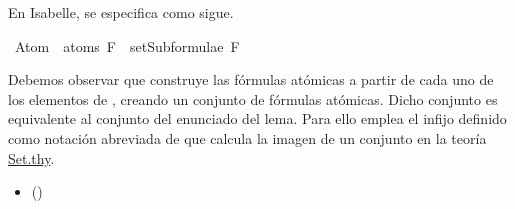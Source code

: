 \begin{isabellebody}
\begin{isamarkuptext}
  En Isabelle, se especifica como sigue.%
\end{isamarkuptext}\isamarkuptrue%
\isamarkupfalse%
\ {\isachardoublequoteopen}Atom\ {\isacharbackquote}\ atoms\ F\ {\isasymsubseteq}\ setSubformulae\ F{\isachardoublequoteclose}\isanewline
%
\isadelimproof
\ \ %
\endisadelimproof
%
\isatagproof
{}\isamarkupfalse%
%
\endisatagproof
{\isafoldproof}%
%
\isadelimproof
%
\endisadelimproof
%
\begin{isamarkuptext}%
Debemos observar que  construye las fórmulas 
  atómicas a partir de cada uno de los elementos de , creando 
  un conjunto de fórmulas atómicas. Dicho conjunto es equivalente al 
  conjunto  del enunciado del lema. Para ello emplea el infijo \isa{{\isacharbackquote}} 
  definido como notación abreviada de \isa{{\isacharparenleft}{\isacharbackquote}{\isacharparenright}} que calcula la 
  imagen de un conjunto en la teoría \href{https://n9.cl/qatp}{Set.thy}.

  \begin{itemize}
    \item[]  
      \hfill ()
  \end{itemize}


\end{isamarkuptext}
\end{isabellebody}
